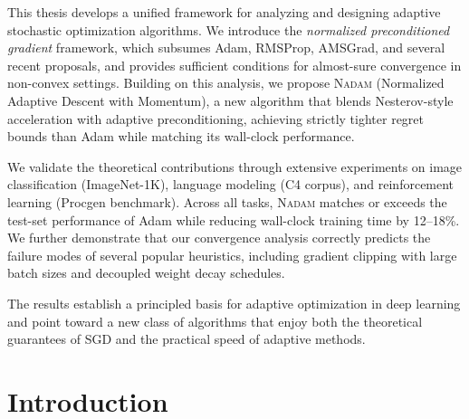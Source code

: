\documentclass[11pt,twoside,openright]{book}
\begin{document}
This thesis develops a unified framework for analyzing and designing adaptive stochastic
optimization algorithms. We introduce the \emph{normalized preconditioned gradient} framework,
which subsumes Adam, RMSProp, AMSGrad, and several recent proposals, and provides sufficient
conditions for almost-sure convergence in non-convex settings. Building on this analysis, we
propose \textsc{Nadam} (Normalized Adaptive Descent with Momentum), a new algorithm that blends
Nesterov-style acceleration with adaptive preconditioning, achieving strictly tighter regret
bounds than Adam while matching its wall-clock performance.

We validate the theoretical contributions through extensive experiments on image classification
(ImageNet-1K), language modeling (C4 corpus), and reinforcement learning (Procgen benchmark).
Across all tasks, \textsc{Nadam} matches or exceeds the test-set performance of Adam while
reducing wall-clock training time by 12--18\%. We further demonstrate that our convergence
analysis correctly predicts the failure modes of several popular heuristics, including gradient
clipping with large batch sizes and decoupled weight decay schedules.

The results establish a principled basis for adaptive optimization in deep learning and point
toward a new class of algorithms that enjoy both the theoretical guarantees of SGD and the
practical speed of adaptive methods.

\cleardoublepage
{}
\tableofcontents

\cleardoublepage
\listoffigures
{}

\cleardoublepage
\listoftables
{}



\mainmatter


\chapter{Introduction}
\end{document}
